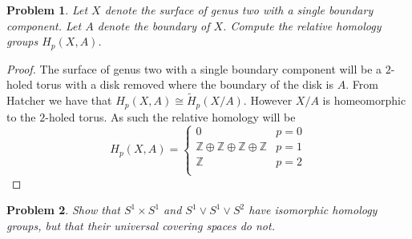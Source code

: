 \documentclass[10pt]{article}
\newcommand{\sk}{\vskip 10mm}
\newcommand{\bb}[1]{\mathbb{#1}}
\theoremstyle{plain}
\newtheorem{problem}{Problem}
\theoremstyle{remark}
\begin{document}
\begin{problem}
  Let $X$ denote the surface of genus two with a single boundary component.
  Let $A$ denote the boundary of $X$. Compute the relative homology groups
  $H_p(X,A)$.
\end{problem}

\begin{proof}
  The surface of genus two with a single boundary component will be a $2$-holed
  torus with a disk removed where the boundary of the disk is $A$. From Hatcher
  we have that $H_p(X,A)\cong \widetilde{H}_p(X/A)$. However $X/A$ is homeomorphic
  to the $2$-holed torus. As such the relative homology will be
  \[
    H_p(X,A)=
    \left\{
      \begin{array}{cr}
        0&p=0\\
        \bb{Z}\oplus\bb{Z}\oplus\bb{Z}\oplus\bb{Z} & p=1\\
        \bb{Z}&p=2\\
      \end{array}
    \right.
  \]
\end{proof}

\sk

\begin{problem}
  Show that $S^1\times S^1$ and $S^1\vee S^1\vee S^2$ have isomorphic homology groups,
  but that their universal covering spaces do not.
\end{problem}
\end{document}
